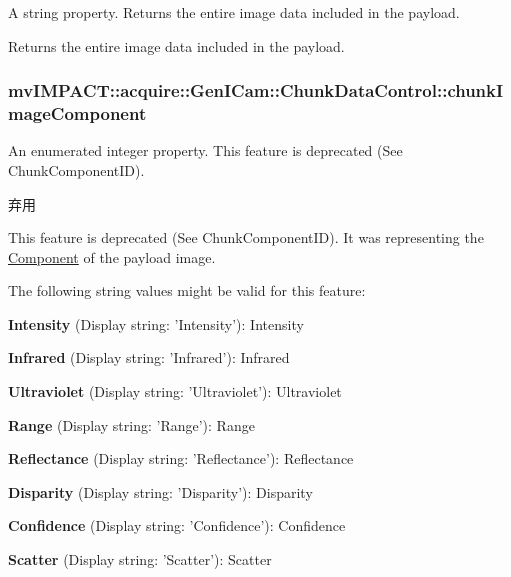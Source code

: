 A string property. Returns the entire image data included in the payload. 

Returns the entire image data included in the payload. \hypertarget{classmv_i_m_p_a_c_t_1_1acquire_1_1_gen_i_cam_1_1_chunk_data_control_a0abd13d321577a5794abad963840cc6c}{
\subsubsection[{chunk\+Image\+Component}]{ mv\+I\+M\+P\+A\+C\+T\+::acquire\+::\+Gen\+I\+Cam\+::\+Chunk\+Data\+Control\+::chunk\+Image\+Component}}\label{classmv_i_m_p_a_c_t_1_1acquire_1_1_gen_i_cam_1_1_chunk_data_control_a0abd13d321577a5794abad963840cc6c}


An enumerated integer property. This feature is deprecated (See Chunk\+Component\+I\+D). 

\begin{DoxyRefDesc}{弃用}
\item[\hyperlink{deprecated__deprecated000055}{弃用}]This feature is deprecated (See Chunk\+Component\+I\+D). It was representing the \hyperlink{classmv_i_m_p_a_c_t_1_1acquire_1_1_component}{Component} of the payload image.\end{DoxyRefDesc}


The following string values might be valid for this feature\+:
\begin{DoxyItemize}
\item {\bfseries Intensity} (Display string\+: 'Intensity')\+: Intensity
\item {\bfseries Infrared} (Display string\+: 'Infrared')\+: Infrared
\item {\bfseries Ultraviolet} (Display string\+: 'Ultraviolet')\+: Ultraviolet
\item {\bfseries Range} (Display string\+: 'Range')\+: Range
\item {\bfseries Reflectance} (Display string\+: 'Reflectance')\+: Reflectance
\item {\bfseries Disparity} (Display string\+: 'Disparity')\+: Disparity
\item {\bfseries Confidence} (Display string\+: 'Confidence')\+: Confidence
\item {\bfseries Scatter} (Display string\+: 'Scatter')\+: Scatter
\end{DoxyItemize}

